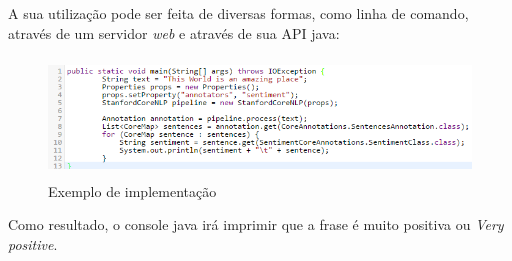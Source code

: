 A sua utilização pode ser feita de diversas formas, como linha de comando,
através de um servidor \textit{web} e através de sua API java:


\begin{figure}[htbp]
 \centering
 \includegraphics[height=120px]{imagens/corenlp1.png}
 \caption{Exemplo de implementação}
 \label{fig:corenlp}
\end{figure}

Como resultado, o console java irá imprimir que a frase é muito positiva ou
\textit{Very positive}.

